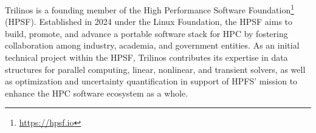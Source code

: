Trilinos is a founding member of the High Performance Software Foundation\footnote{\url{https://hpsf.io}} (HPSF).
Established in 2024 under the Linux Foundation,
the HPSF aims to build, promote, and advance a portable software stack for HPC by fostering collaboration among industry, academia, and government entities.
As an initial technical project within the HPSF, Trilinos contributes its expertise in data structures for parallel computing, linear, nonlinear, and transient solvers,
as well as optimization and uncertainty quantification in support of HPFS' mission to enhance the HPC software ecosystem as a whole.
